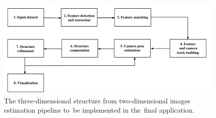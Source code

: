 \begin{figure}[t]
	\begin{center}
		\includegraphics[keepaspectratio,width=\textwidth]{fig/pipeline.pdf}
	\end{center}
	\caption{The three-dimensional structure from two-dimensional images estimation pipeline to~be implemented in the~final application.}
	\label{fig:pipeline}
\end{figure}

